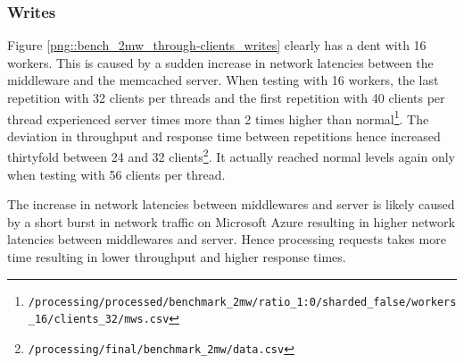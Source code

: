 \documentclass[11pt,a4paper]{article}
\begin{document}
\subsubsection{Writes}
Figure \ref{png::bench_2mw_through-clients_writes} clearly has a dent with 16 workers. This is caused by a sudden increase in network latencies between the middleware and the memcached server. When testing with 16 workers, the last repetition with 32 clients per threads and the first repetition with 40 clients per thread experienced server times more than 2 times higher than normal\footnote{\texttt{/processing/processed/benchmark_2mw/ratio_1:0/sharded_false/workers_16/clients_32/mws.csv}}. The deviation in throughput and response time between repetitions hence increased thirtyfold between 24 and 32 clients\footnote{\texttt{/processing/final/benchmark_2mw/data.csv}}. It actually reached normal levels again only when testing with 56 clients per thread.

The increase in network latencies between middlewares and server is likely caused by a short burst in network traffic on Microsoft Azure resulting in higher network latencies between middlewares and server. Hence processing requests takes more time resulting in lower throughput and higher response times.
\end{document}

